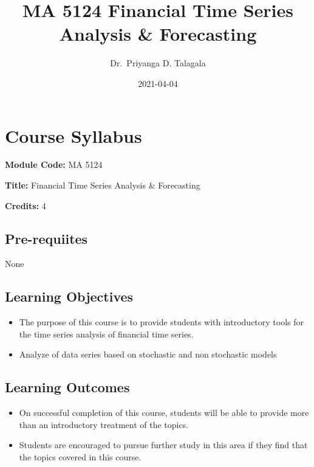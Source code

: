 \documentclass[]{book}
\title{MA 5124 Financial Time Series Analysis \& Forecasting}
\author{Dr.~Priyanga D. Talagala}
\date{2021-04-04}
\providecommand{\tightlist}{%
  \setlength{\itemsep}{0pt}\setlength{\parskip}{0pt}}
\begin{document}
\maketitle

{
\setcounter{tocdepth}{1}
\tableofcontents
}
\hypertarget{course-syllabus}{%
\chapter*{Course Syllabus}\label{course-syllabus}}


\textbf{Module Code:} MA 5124

\textbf{Title:} Financial Time Series Analysis \& Forecasting

\textbf{Credits:} 4

\hypertarget{pre-requiites}{%
\section*{Pre-requiites}\label{pre-requiites}}

None

\hypertarget{learning-objectives}{%
\section*{Learning Objectives}\label{learning-objectives}}

\begin{itemize}
\tightlist
\item
  The purpose of this course is to provide students with introductory tools for the time series analysis of financial time series.
\item
  Analyze of data series based on stochastic and non stochastic models
\end{itemize}

\hypertarget{learning-outcomes}{%
\section*{Learning Outcomes}\label{learning-outcomes}}

\begin{itemize}
\tightlist
\item
  On successful completion of this course, students will be able to provide more than an introductory treatment of the topics.
\item
  Students are encouraged to pursue further study in this area if they find that the topics covered in this course.
\end{itemize}
\end{document}
